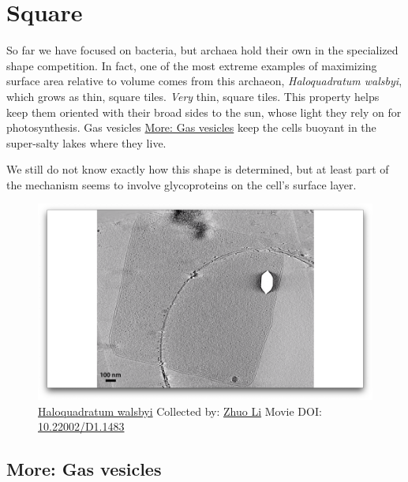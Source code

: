 \documentclass[]{tufte-book}
\begin{document}
\section{Square}\label{square}

So far we have focused on bacteria, but archaea hold their own in the
specialized shape competition. In fact, one of the most extreme examples
of maximizing surface area relative to volume comes from this archaeon,
\emph{Haloquadratum walsbyi}, which grows as thin, square tiles.
\emph{Very} thin, square tiles. This property helps keep them oriented
with their broad sides to the sun, whose light they rely on for
photosynthesis. Gas vesicles \protect\hyperlink{Gas_vesicles}{More: Gas
vesicles} keep the cells buoyant in the super-salty lakes where they
live.

We still do not know exactly how this shape is determined, but at least
part of the mechanism seems to involve glycoproteins on the cell's
surface layer.





\begin{figure}
\includegraphics{movie_stills/3_7} \caption[\protect\hyperlink{tree}{Haloquadratum walsbyi} Collected by:
\protect\hyperlink{zhuo_li}{Zhuo Li} Movie DOI:
\href{https://doi.org/10.22002/D1.1483}{10.22002/D1.1483}]{\protect\hyperlink{tree}{Haloquadratum walsbyi} Collected by:
\protect\hyperlink{zhuo_li}{Zhuo Li} Movie DOI:
\href{https://doi.org/10.22002/D1.1483}{10.22002/D1.1483}}\label{fig:3-7}
\end{figure}

\hypertarget{Gas_vesicles}{\subsection*{More: Gas
vesicles}\label{Gas_vesicles}}
\end{document}
